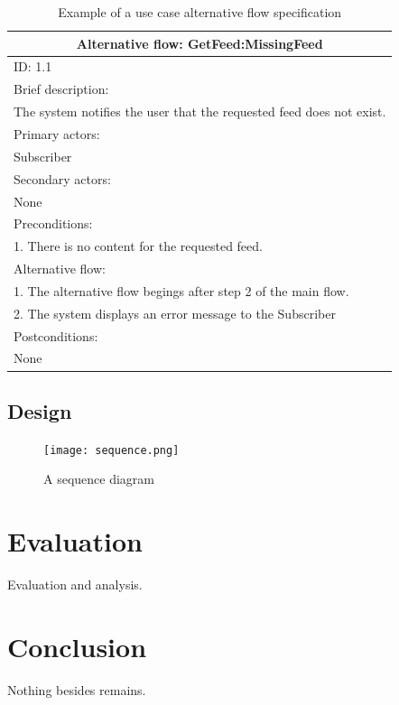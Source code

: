 \documentclass{article}
\begin{document}
\begin{table}[]
\begin{center}
\begin{tabular}{ | p{\textwidth} |}
\hline
\multicolumn{1}{|c|}{Alternative flow: GetFeed:MissingFeed} \\
\hline
ID: 1.1 \\
\hline
Brief description: \\
The system notifies the user that the requested feed does not exist. \\
\hline
Primary actors: \\
Subscriber \\
\hline
Secondary actors: \\
None \\
\hline
Preconditions: \\
1. There is no content for the requested feed. \\
\hline
Alternative flow: \\
1. The alternative flow begings after step 2 of the main flow. \\
2. The system displays an error message to the Subscriber \\
\hline
Postconditions: \\
None \\
\hline
\end{tabular}
\end{center}
\caption{Example of a use case alternative flow specification}
\label{use-case-alt-detail}
\end{table}

\clearpage
\subsection{Design}

\begin{figure}
  \begin{center}
    \texttt{[image: sequence.png]}
  \end{center}
  \label{sequence}
  \caption{A sequence diagram}
\end{figure}

\section{Evaluation}
Evaluation and analysis.


\section{Conclusion}
Nothing besides remains.
\end{document}
